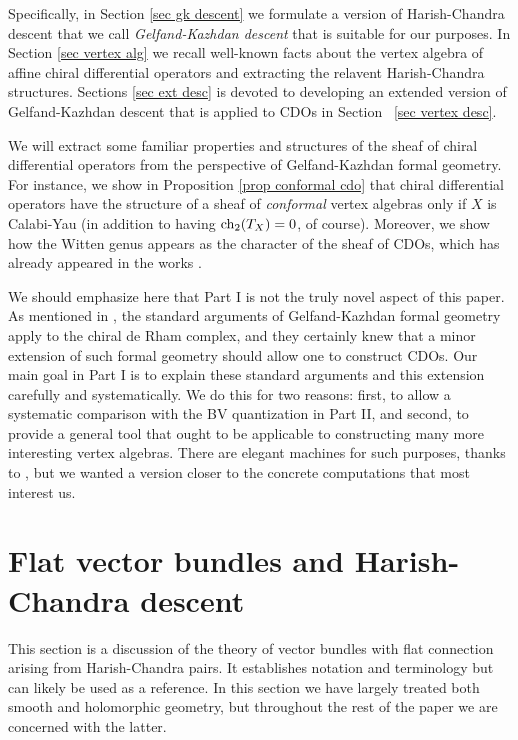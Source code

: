 Specifically, in Section \ref{sec gk descent} we formulate a version of Harish-Chandra descent that we call {\em Gelfand-Kazhdan descent} that is suitable for our purposes. In Section \ref{sec vertex alg} we recall well-known facts about the vertex algebra of affine chiral differential operators and extracting the relavent Harish-Chandra structures. Sections \ref{sec ext desc} is devoted to developing an extended version of Gelfand-Kazhdan descent that is applied to CDOs in Section ~\ref{sec vertex desc}.

We will extract some familiar properties and structures of the sheaf of chiral differential operators from the perspective of Gelfand-Kazhdan formal geometry. For instance, we show in Proposition \ref{prop conformal cdo} that chiral differential operators have the structure of a sheaf of {\em conformal} vertex algebras only if $X$ is Calabi-Yau (in addition to having ${\rm ch}_2(T_X) = 0$, of course). Moreover, we show how the Witten genus appears as the character of the sheaf of CDOs, which has already appeared in the works \cite{Cheung, BorLib}. 

\begin{rmk} We should emphasize here that Part I is not the truly novel aspect of this paper. As mentioned in \cite{MSV}, the standard arguments of Gelfand-Kazhdan formal geometry apply to the chiral de Rham complex, and they certainly knew that a minor extension of such formal geometry should allow one to construct CDOs. Our main goal in Part I is to explain these standard arguments and this extension carefully and systematically. We do this for two reasons: first, to allow a systematic comparison with the BV quantization in Part II, and second, to provide a general tool that ought to be applicable to constructing many more interesting vertex algebras. There are elegant machines for such purposes, thanks to \cite{BD, KV}, but we wanted a version closer to the concrete computations that most interest us.
\end{rmk}

\section{Flat vector bundles and Harish-Chandra descent} \label{sec hc descent}

This section is a discussion of the theory of vector bundles with flat connection arising from Harish-Chandra pairs. It establishes notation and terminology but can likely be used as a reference. In this section we have largely treated both smooth and holomorphic geometry, but throughout the rest of the paper we are concerned with the latter.

